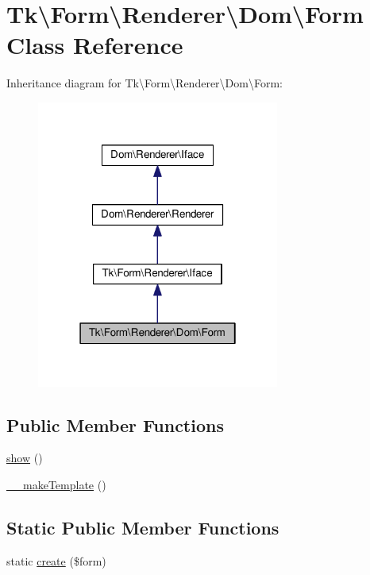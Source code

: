 \hypertarget{classTk_1_1Form_1_1Renderer_1_1Dom_1_1Form}{\section{Tk\textbackslash{}Form\textbackslash{}Renderer\textbackslash{}Dom\textbackslash{}Form Class Reference}
\label{classTk_1_1Form_1_1Renderer_1_1Dom_1_1Form}
}


Inheritance diagram for Tk\textbackslash{}Form\textbackslash{}Renderer\textbackslash{}Dom\textbackslash{}Form\+:\nopagebreak
\begin{figure}[H]
\begin{center}
\leavevmode
\includegraphics[width=226pt]{classTk_1_1Form_1_1Renderer_1_1Dom_1_1Form__inherit__graph}
\end{center}
\end{figure}
\subsection*{Public Member Functions}
\begin{DoxyCompactItemize}
\item 
\hyperlink{classTk_1_1Form_1_1Renderer_1_1Dom_1_1Form_a2b67b6b33d1cffdffc04010dad181b93}{show} ()
\item 
\hyperlink{classTk_1_1Form_1_1Renderer_1_1Dom_1_1Form_a5897b87d63f146172fa962206bcb38bf}{\+\_\+\+\_\+make\+Template} ()
\end{DoxyCompactItemize}
\subsection*{Static Public Member Functions}
\begin{DoxyCompactItemize}
\item 
static \hyperlink{classTk_1_1Form_1_1Renderer_1_1Dom_1_1Form_af2be34b469d7433b657390e259d6e634}{create} (\$form)
\end{DoxyCompactItemize}
